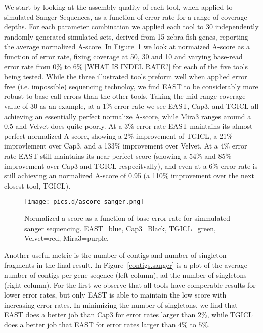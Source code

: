 \documentclass[10pt]{bmc_article}
\newcommand{\capthree} {{\small Cap3}}
\newcommand{\tgicl} {{\small TGICL}}
\newcommand{\east} {{\small EAST}}
\newcommand{\velvet}{{\small Velvet}}
\newcommand{\mira}{{\small Mira3}}
\newenvironment{bmcformat}{\begin{raggedright}\baselineskip20pt\sloppy\setboolean{publ}{false}}{\end{raggedright}\baselineskip20pt\sloppy}
\begin{document}
\begin{bmcformat}
 We start by looking at the assembly
quality of each tool, when applied to simulated Sanger Sequences, as a
function of error rate for a range of coverage depths.  For each
parameter combination we applied each tool to 30 independently
randomly generated simulated sets, derived from 15 zebra fish genes,
reporting the average normalized A-score.  In
Figure~\ref{sangerAscore} we look at normaized A-score as a function
of error rate, fixing coverage at 50, 30 and 10 and varying base-read
error rate from 0\% to 6\% [WHAT IS INDEL RATE?] for each of the five
tools being tested.  While the three illustrated tools preform well
when applied error free (i.e. impossible) sequencing technoloy, we
find \east\/ to be considerably more robust to base-call errors than the
other tools.  Taking the mid-range coverage value of 30 as an example,
at a 1\% error rate we see \east, \capthree, and \tgicl\/ all achieving an
essentially perfect normalize A-score, while \mira\/ ranges around a 0.5
and \velvet\/ does quite poorly.  At a 3\% error rate \east\/ maintains its
almost perfect normalized A-score, showing a 2\% improvement of \tgicl,
a 21\% improvlement over \capthree, and a 133\% improvement over \velvet.
At a 4\% error rate \east\/ still maintains its near-perfect score
(showing a 54\% and 85\% improvement over \capthree\/ and \tgicl\/
respecitvally), and even at a 6\% error rate is still achieving an
normalized A-score of 0.95 (a 110\% improvement over the next closest
tool, \tgicl\/).


\begin{figure}[htb]
\centerline{\texttt{[image: pics.d/ascore\_sanger.png]}}
\label{sangerAscore}
\caption{Normalized a-score as a function of base error rate for
  simmulated sanger sequencing.  \east=blue, \capthree=Black,
  \tgicl=green, \velvet=red, \mira=purple.}
\end{figure}

Another useful metric is the number of contigs and number of singleton
fragments in the final result.  In Figure~\ref{contigs.sanger} is a
plot of the average number of contigs per gene seqence (left column), ad
the number of singletons (right column).  For the first we observe that all tools have
comperable results for lower error rates, but only \east\/ is able to
maintain the low score with increasing error rates.  In minimizing the
number of singletons, we find that \east\/ does a better job than
\capthree\/ for error rates larger than $2\%$, while TGICL does a
better job that \east\/ for error rates larger than $4\%$ to $5\%$.


\end{bmcformat}
\end{document}
